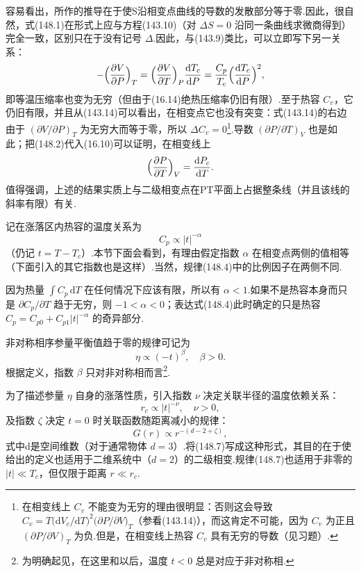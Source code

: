 容易看出，所作的推导在于使S沿相变点曲线的导数的发散部分等于零.因此，很自然，式(148.1)在形式上应与方程(143.10)（对 $\Delta S=0$ 沿同一条曲线求微商得到）完全一致，区别只在于没有记号 $\Delta$.因此，与(143.9)类比，可以立即写下另一关系：
\begin{equation}
  -\Bigl(\frac{\partial V}{\partial P}\Bigr)_T
  =\Bigl(\frac{\partial V}{\partial T}\Bigr)_P\frac{\mathrm{d}T_c}{\mathrm{d}P}
  =\frac{C_p}{T_c}\Bigl(\frac{\mathrm{d}T_c}{\mathrm{d}P}\Bigr)^2,
\end{equation}
即等温压缩率也变为无穷（但由于(16.14)绝热压缩率仍旧有限）.至于热容 $C_v$，它仍旧有限，并且从(143.14)可以看出，在相变点它也没有突变：式(143.14)的右边由于 $(\partial V/\partial P)_T$ 为无穷大而等于零，所以 $\Delta C_v=0$\footnote{在相变线上 $C_v$ 不能变为无穷的理由很明显：否则这会导致 $C_v=T\bigl(\mathrm{d}V_c/\mathrm{d}T\bigr)^2\bigl(\partial P/\partial V\bigr)_T$（参看(143.14)），而这肯定不可能，因为 $C_v$ 为正且 $(\partial P/\partial V)_T$ 为负.但是，在相变线上热容 $C_v$ 具有无穷的导数（见习题）.}.导数 $(\partial P/\partial T)_V$ 也是如此；把(148.2)代入(16.10)可以证明，在相变线上
\begin{equation}
  \Bigl(\frac{\partial P}{\partial T}\Bigr)_V=\frac{\mathrm{d}P_c}{\mathrm{d}T}.
\end{equation}
值得强调，上述的结果实质上与二级相变点在PT平面上占据整条线（并且该线的斜率有限）有关.

记在涨落区内热容的温度关系为
\begin{equation}
  C_p\propto|t|^{-\alpha}
\end{equation}
（仍记 $t=T-T_c$）.本节下面会看到，有理由假定指数 $\alpha$ 在相变点两侧的值相等（下面引入的其它指数也是这样）.当然，规律(148.4)中的比例因子在两侧不同.

因为热量 $\int C_p\,\mathrm{d}T$ 在任何情况下应该有限，所以有 $\alpha<1$.如果不是热容本身而只是 $\partial C_p/\partial T$ 趋于无穷，则 $-1<\alpha<0$；表达式(148.4)此时确定的只是热容 $C_p=C_{p0}+C_{p1}|t|^{-\alpha}$ 的奇异部分.

非对称相序参量平衡值趋于零的规律可记为
\begin{equation}
  \eta\propto(-t)^{\beta},\quad\beta>0.
\end{equation}
根据定义，指数 $\beta$ 只对非对称相而言\footnote{为明确起见，在这里和以后，温度 $t<0$ 总是对应于非对称相.}.

为了描述参量 $\eta$ 自身的涨落性质，引入指数 $\nu$ 决定关联半径的温度依赖关系：
\begin{equation}
  r_c\propto|t|^{-\nu},\quad\nu>0,
\end{equation}
及指数 $\zeta$ 决定 $t=0$ 时关联函数随距离减小的规律：
\begin{equation}
  G(r)\propto r^{-(d-2+\zeta)},
\end{equation}
式中d是空间维数（对于通常物体 $d=3$）.将(148.7)写成这种形式，其目的在于使给出的定义也适用于二维系统中（$d=2$）的二级相变.规律(148.7)也适用于非零的 $|t|\ll T_c$，但仅限于距离 $r\ll r_c$.

